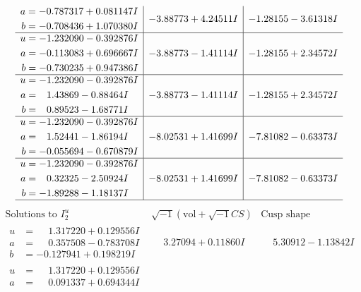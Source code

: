 \documentclass[1p]{elsarticle_modified}
\theoremstyle{definition}
\newcommand{\I}{\sqrt{-1}}
\begin{document}
$$\begin{array}{c|c|c}
\begin{aligned}
a &= -0.787317 + 0.081147 I \\
b &= -0.708436 + 1.070380 I\end{aligned}
 & -3.88773 + 4.24511 I & -1.28155 - 3.61318 I \\ \hline\begin{aligned}
u &= -1.232090 - 0.392876 I \\
a &= -0.113083 + 0.696667 I \\
b &= -0.730235 + 0.947386 I\end{aligned}
 & -3.88773 - 1.41114 I & -1.28155 + 2.34572 I \\ \hline\begin{aligned}
u &= -1.232090 - 0.392876 I \\
a &= \phantom{-}1.43869 - 0.88464 I \\
b &= \phantom{-}0.89523 - 1.68771 I\end{aligned}
 & -3.88773 - 1.41114 I & -1.28155 + 2.34572 I \\ \hline\begin{aligned}
u &= -1.232090 - 0.392876 I \\
a &= \phantom{-}1.52441 - 1.86194 I \\
b &= -0.055694 - 0.670879 I\end{aligned}
 & -8.02531 + 1.41699 I & -7.81082 - 0.63373 I \\ \hline\begin{aligned}
u &= -1.232090 - 0.392876 I \\
a &= \phantom{-}0.32325 - 2.50924 I \\
b &= -1.89288 - 1.18137 I\end{aligned}
 & -8.02531 + 1.41699 I & -7.81082 - 0.63373 I\\
 \hline 
 \end{array}$$\newpage$$\begin{array}{c|c|c}  
\text{Solutions to }I^u_{2}& \I (\text{vol} + \sqrt{-1}CS) & \text{Cusp shape}\\
 \hline 
\begin{aligned}
u &= \phantom{-}1.317220 + 0.129556 I \\
a &= \phantom{-}0.357508 - 0.783708 I \\
b &= -0.127941 + 0.198219 I\end{aligned}
 & \phantom{-}3.27094 + 0.11860 I & \phantom{-}5.30912 - 1.13842 I \\ \hline\begin{aligned}
u &= \phantom{-}1.317220 + 0.129556 I \\
a &= \phantom{-}0.091337 + 0.694344 I \\

\end{aligned}
\end{array}$$
\end{document}
